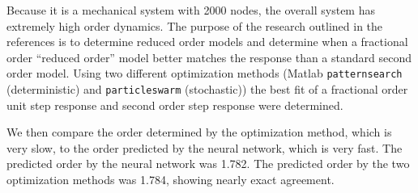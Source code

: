 Because it is a mechanical system with 2000 nodes, the overall system has
extremely high order dynamics. The purpose of the research outlined in the
references is to determine reduced order models and determine when a fractional
order ``reduced order'' model better matches the response than a standard second
order model. Using two different optimization methods (Matlab
\texttt{patternsearch} (deterministic) and \texttt{particleswarm} (stochastic))
the best fit of a fractional order unit step response and second order step
response were determined. 

We then compare the order determined by the optimization method, which is very
slow, to the order predicted by the neural network, which is very fast.  The
predicted order by the neural network was 1.782. The predicted order by the two
optimization methods was 1.784, showing nearly exact agreement.
